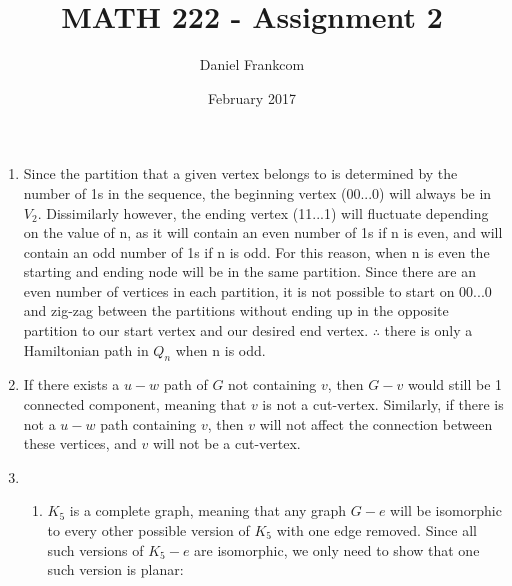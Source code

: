 \documentclass{article}
\title{MATH 222 - Assignment 2}
\date{February 2017}
\author{Daniel Frankcom}
\begin{document}
	\maketitle
	\setlength{\parindent}{0pt}
	\newcommand{\forceindent}{\leavevmode{\parindent=72pt\indent}}
	\newpage
	
	\begin{enumerate}
		\item Since the partition that a given vertex belongs to is determined by the number of 1s in the sequence, the beginning vertex (00...0) will always be in $V_2$. Dissimilarly however, the ending vertex (11...1) will fluctuate depending on the value of n, as it will contain an even number of 1s if n is even, and will contain an odd number of 1s if n is odd.
		\newline For this reason, when n is even the starting and ending node will be in the same partition.
		\newline Since there are an even number of vertices in each partition, it is not possible to start on 00...0 and zig-zag between the partitions without ending up in the opposite partition to our start vertex and our desired end vertex.
		\newline $\therefore$ there is only a Hamiltonian path in $Q_n$ when n is odd.
		
		\item If there exists a $u-w$ path of $G$ not containing $v$, then $G-v$ would still be 1 connected component, meaning that $v$ is not a cut-vertex. Similarly, if there is not a $u-w$ path containing $v$, then $v$ will not affect the connection between these vertices, and $v$ will not be a cut-vertex.
		
		\item
		\begin{enumerate}
			\item $K_5$ is a complete graph, meaning that any graph $G-e$ will be isomorphic to every other possible version of $K_5$ with one edge removed. Since all such versions of $K_5-e$ are isomorphic, we only need to show that one such version is planar:
			\newline\newline
\end{enumerate}
\end{enumerate}
\end{document}
